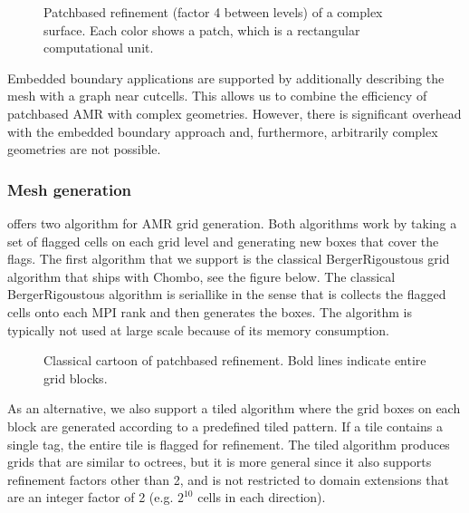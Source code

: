 \documentclass[letterpaper,10pt,english]{sphinxmanual}
\let\sphinxpxdimen\pdfpxdimen\else\newdimen\sphinxpxdimen
\begin{document}
\begin{figure}[htb]
\centering
\capstart

\noindent\sphinxincludegraphics[width=480\sphinxpxdimen]{{complex_patches}.png}
\caption{Patch\sphinxhyphen{}based refinement (factor 4 between levels) of a complex surface. Each color shows a patch, which is a rectangular computational unit.}\label{\detokenize{Model:id2}}\end{figure}

Embedded boundary applications are supported by additionally describing the mesh with a graph near cut\sphinxhyphen{}cells.
This allows us to combine the efficiency of patch\sphinxhyphen{}based AMR with complex geometries.
However, there is significant overhead with the embedded boundary approach and, furthermore, arbitrarily complex geometries are not possible.


\subsubsection{Mesh generation}
\label{\detokenize{Model:mesh-generation}}\label{\detokenize{Model:chap-meshgeneration}}
 offers two algorithm for AMR grid generation.
Both algorithms work by taking a set of flagged cells on each grid level and generating new boxes that cover the flags.
The first algorithm that we support is the classical Berger\sphinxhyphen{}Rigoustous grid algorithm that ships with Chombo, see the figure below.
The classical Berger\sphinxhyphen{}Rigoustous algorithm is serial\sphinxhyphen{}like in the sense that is collects the flagged cells onto each MPI rank and then generates the boxes.
The algorithm is typically not used at large scale because of its memory consumption.

\begin{figure}[htb]
\centering
\capstart

\noindent\sphinxincludegraphics[width=240\sphinxpxdimen]{{amr}.png}
\caption{Classical cartoon of patch\sphinxhyphen{}based refinement. Bold lines indicate entire grid blocks.}\label{\detokenize{Model:id3}}\end{figure}

As an alternative, we also support a tiled algorithm where the grid boxes on each block are generated according to a predefined tiled pattern.
If a tile contains a single tag, the entire tile is flagged for refinement.
The tiled algorithm produces grids that are similar to octrees, but it is more general since it also supports refinement factors other than 2, and is not restricted to domain extensions that are an integer factor of 2 (e.g. \(2^{10}\) cells in each direction).
\end{document}
